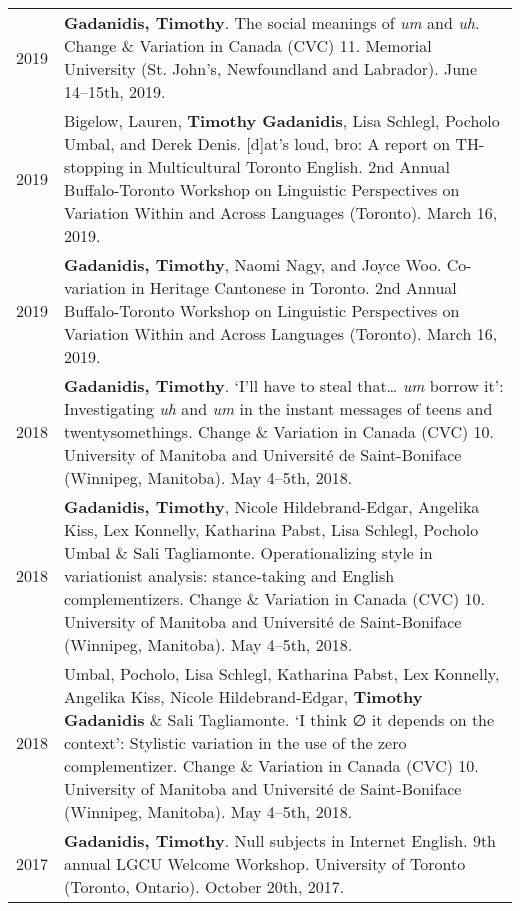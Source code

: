 \documentclass[letterpaper]{article}
\begin{document}
\begin{longtable}{p{}p{}}
    2019 & \textbf{Gadanidis, Timothy}. The social meanings of \emph{um} and
    \emph{uh}. Change \& Variation in Canada (CVC) 11. Memorial University (St.
    John's, Newfoundland and Labrador). June 14--15th, 2019. \\
    2019 & Bigelow, Lauren, \textbf{Timothy Gadanidis}, Lisa Schlegl, Pocholo
    Umbal, and Derek Denis.  [d]at's loud, bro: A report on TH-stopping in
    Multicultural Toronto English.  2nd Annual Buffalo-Toronto Workshop on
    Linguistic Perspectives on Variation Within and Across Languages (Toronto).
    March 16, 2019. \\
    2019 & \textbf{Gadanidis, Timothy}, Naomi Nagy, and Joyce Woo.  Co-variation
    in Heritage Cantonese in Toronto.  2nd Annual Buffalo-Toronto Workshop on
    Linguistic Perspectives on Variation Within and Across Languages (Toronto).
    March 16, 2019. \\
    2018 & \textbf{Gadanidis, Timothy}.  `I'll have to steal that\ldots{}
    \emph{um} borrow it': Investigating \emph{uh} and \emph{um} in the instant
    messages of teens and twentysomethings.  Change \& Variation in Canada (CVC)
    10. University of Manitoba and Université de Saint-Boniface (Winnipeg,
    Manitoba). May 4--5th, 2018. \\
    2018 & \textbf{Gadanidis, Timothy}, Nicole Hildebrand-Edgar, Angelika Kiss,
    Lex Konnelly, Katharina Pabst, Lisa Schlegl, Poc\-holo Umbal \& Sali
    Tagliamonte.  Operationalizing style in variationist analysis: stance-taking
    and English complementizers.  Change \& Variation in Canada (CVC) 10.
    University of Manitoba and Université de Saint-Boniface (Winnipeg,
    Manitoba). May 4--5th, 2018. \\
    2018 & Umbal, Pocholo, Lisa Schlegl, Katharina Pabst, Lex Konnelly, Angelika
    Kiss, Nicole Hildebrand-Edgar, \textbf{Timothy Gadanidis} \& Sali
    Tagliamonte.  `I think ∅ it depends on the context': Stylistic variation in
    the use of the zero complementizer.  Change \& Variation in Canada (CVC) 10.
    University of Manitoba and Université de Saint-Boniface (Winnipeg,
    Manitoba). May 4--5th, 2018. \\
    2017 & \textbf{Gadanidis, Timothy}.  Null subjects in Internet English.  9th
    annual LGCU Welcome Workshop. University of Toronto (Toronto, Ontario).
    October 20th, 2017. \\
\end{longtable}
\end{document}
